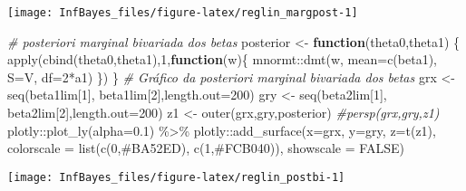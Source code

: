 \documentclass[
]{book}
\newenvironment{Shaded}{\begin{snugshade}}{\end{snugshade}}
\newcommand{\AttributeTok}[1]{\textcolor[rgb]{0.77,0.63,0.00}{#1}}
\newcommand{\CommentTok}[1]{\textcolor[rgb]{0.56,0.35,0.01}{\textit{#1}}}
\newcommand{\ConstantTok}[1]{\textcolor[rgb]{0.00,0.00,0.00}{#1}}
\newcommand{\ControlFlowTok}[1]{\textcolor[rgb]{0.13,0.29,0.53}{\textbf{#1}}}
\newcommand{\DecValTok}[1]{\textcolor[rgb]{0.00,0.00,0.81}{#1}}
\newcommand{\FloatTok}[1]{\textcolor[rgb]{0.00,0.00,0.81}{#1}}
\newcommand{\FunctionTok}[1]{\textcolor[rgb]{0.00,0.00,0.00}{#1}}
\newcommand{\NormalTok}[1]{#1}
\newcommand{\OtherTok}[1]{\textcolor[rgb]{0.56,0.35,0.01}{#1}}
\newcommand{\SpecialCharTok}[1]{\textcolor[rgb]{0.00,0.00,0.00}{#1}}
\newcommand{\StringTok}[1]{\textcolor[rgb]{0.31,0.60,0.02}{#1}}
\begin{document}
\begin{center}\texttt{[image: InfBayes\_files/figure-latex/reglin\_margpost-1]} \end{center}

\begin{Shaded}
\begin{Highlighting}[]
\CommentTok{\# posteriori marginal bivariada dos betas}
\NormalTok{posterior }\OtherTok{\textless{}{-}} \ControlFlowTok{function}\NormalTok{(theta0,theta1) \{ }\FunctionTok{apply}\NormalTok{(}\FunctionTok{cbind}\NormalTok{(theta0,theta1),}\DecValTok{1}\NormalTok{,}\ControlFlowTok{function}\NormalTok{(w)\{ mnormt}\SpecialCharTok{::}\FunctionTok{dmt}\NormalTok{(w, }\AttributeTok{mean=}\FunctionTok{c}\NormalTok{(beta1), }\AttributeTok{S=}\NormalTok{V, }\AttributeTok{df=}\DecValTok{2}\SpecialCharTok{*}\NormalTok{a1)  \}) \}}
\CommentTok{\# Gráfico da posteriori marginal bivariada dos betas}
\NormalTok{grx }\OtherTok{\textless{}{-}} \FunctionTok{seq}\NormalTok{(beta1lim[}\DecValTok{1}\NormalTok{], beta1lim[}\DecValTok{2}\NormalTok{],}\AttributeTok{length.out=}\DecValTok{200}\NormalTok{)}
\NormalTok{gry }\OtherTok{\textless{}{-}} \FunctionTok{seq}\NormalTok{(beta2lim[}\DecValTok{1}\NormalTok{], beta2lim[}\DecValTok{2}\NormalTok{],}\AttributeTok{length.out=}\DecValTok{200}\NormalTok{)}
\NormalTok{z1 }\OtherTok{\textless{}{-}} \FunctionTok{outer}\NormalTok{(grx,gry,posterior)}
\CommentTok{\#persp(grx,gry,z1)}
\NormalTok{plotly}\SpecialCharTok{::}\FunctionTok{plot\_ly}\NormalTok{(}\AttributeTok{alpha=}\FloatTok{0.1}\NormalTok{) }\SpecialCharTok{\%\textgreater{}\%}
\NormalTok{  plotly}\SpecialCharTok{::}\FunctionTok{add\_surface}\NormalTok{(}\AttributeTok{x=}\NormalTok{grx, }\AttributeTok{y=}\NormalTok{gry, }\AttributeTok{z=}\FunctionTok{t}\NormalTok{(z1), }\AttributeTok{colorscale =} \FunctionTok{list}\NormalTok{(}\FunctionTok{c}\NormalTok{(}\DecValTok{0}\NormalTok{,}\StringTok{\textquotesingle{}\#BA52ED\textquotesingle{}}\NormalTok{), }\FunctionTok{c}\NormalTok{(}\DecValTok{1}\NormalTok{,}\StringTok{\textquotesingle{}\#FCB040\textquotesingle{}}\NormalTok{)), }\AttributeTok{showscale =} \ConstantTok{FALSE}\NormalTok{)}
\end{Highlighting}
\end{Shaded}

\begin{center}\texttt{[image: InfBayes\_files/figure-latex/reglin\_postbi-1]} \end{center}
\end{document}
